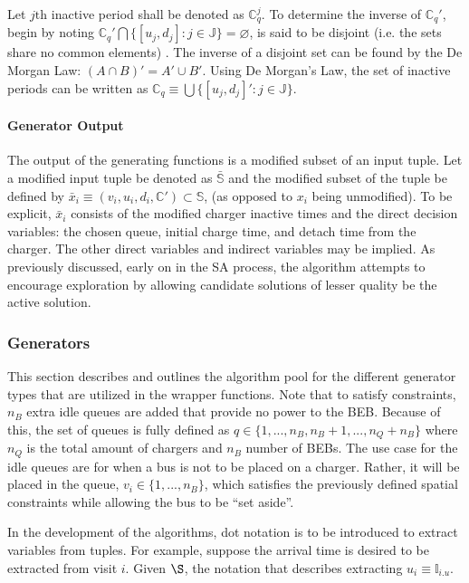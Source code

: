 \documentclass[11pt,a4paper,final]{article}
\newcommand{\I}{\mathbb{I}}                 %
\newcommand{\C}{\mathbb{C}}                 %
\newcommand{\Sol}{\mathbb{S}}               %
\newcommand{\Jsetq}{\mathbb{J}}             %
\begin{document}
Let \(j\text{th}\) inactive period shall be denoted as \(\C^j_q\). To determine the inverse of \(\C_q'\), begin by noting
\(\C_q' \bigcap \{[u_j, d_j] : j \in \Jsetq\} = \varnothing\), is said to be disjoint (i.e. the sets share no common elements)
\cite{halmos-1974-naive-set-theor}. The inverse of a disjoint set can be found by the De Morgan Law: \((A \cap B)' = A' \cup
B'\). Using De Morgan's Law, the set of inactive periods can be written as \(\C_q \equiv \bigcup \{[u_j, d_j]': j \in \Jsetq\}\).

\paragraph{Generator Output}
\label{sec:orga3a4388}
The output of the generating functions is a modified subset of an input tuple. Let a modified input tuple be denoted as
\(\bar{\Sol}\) and the modified subset of the tuple be defined by \(\bar{x}_i \equiv (v_i, u_i, d_i, \C') \subset \Sol\), (as opposed
to \(x_i\) being unmodified). To be explicit, \(\bar{x}_i\) consists of the modified charger inactive times and the direct
decision variables: the chosen queue, initial charge time, and detach time from the charger. The other direct variables
and indirect variables may be implied. As previously discussed, early on in the SA process, the algorithm attempts to
encourage exploration by allowing candidate solutions of lesser quality be the active solution.

\subsubsection{Generators}
\label{sec:generators}
This section describes and outlines the algorithm pool for the different generator types that are utilized in the
wrapper functions. Note that to satisfy constraints, \(n_B\) extra idle queues are added that provide no power to the BEB.
Because of this, the set of queues is fully defined as \(q \in \{1,..., n_B, n_B+1,..., n_Q+n_B\}\) where \(n_Q\) is the total
amount of chargers and \(n_B\) number of BEBs. The use case for the idle queues are for when a bus is not to be placed on
a charger. Rather, it will be placed in the queue, \(v_i \in \{1,..., n_B\}\), which satisfies the previously defined
spatial constraints while allowing the bus to be ``set aside''.

In the development of the algorithms, dot notation is to be introduced to extract variables from tuples. For example,
suppose the arrival time is desired to be extracted from visit \(i\). Given \(\S\), the notation that describes extracting
\(u_i \equiv \I_{i.u}\).
\end{document}
